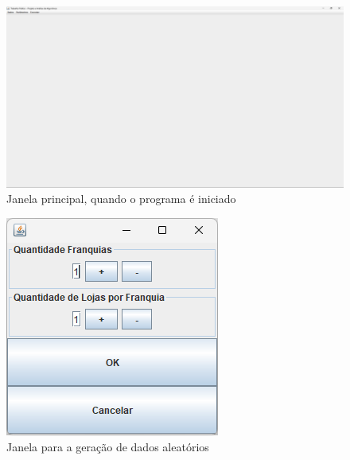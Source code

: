 \documentclass[12pt]{article}
\begin{document}
\begin{figure}[H]
    \centering
    \includegraphics[width=\textwidth]{Captura de tela 2024-06-01 110824}
    \caption{Janela principal, quando o programa é iniciado}
    \label{fig:fig-1}
\end{figure}

\begin{figure}[H]
    \centering
    \includegraphics[width=\textwidth]{Captura de tela 2024-06-01 110836}
    \caption{Janela para a geração de dados aleatórios}
    \label{fig:fig-2}
\end{figure}
\end{document}
